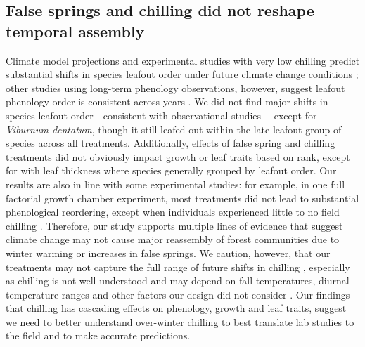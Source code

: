 \documentclass{article}\usepackage[]{graphicx}\usepackage[]{color}
\begin{document}
\subsection*{False springs and chilling did not reshape temporal assembly}
Climate model projections and experimental studies with very low chilling predict substantial shifts in species leafout order under future climate change conditions \citep{Roberts2015, Laube2014}; other studies using long-term phenology observations, however, suggest leafout phenology order is consistent across years \citep{Wesolowski2006}. We did not find major shifts in species leafout order---consistent with observational studies \citep{Wesolowski2006}---except for \textit{Viburnum dentatum}, though it still leafed out within the late-leafout group of species across all treatments. Additionally, effects of false spring and chilling treatments did not obviously impact growth or leaf traits based on rank, except for with leaf thickness where species generally grouped by leafout order. Our results are also in line with some experimental studies: for example, in one full factorial growth chamber experiment, most treatments did not lead to substantial phenological reordering, except when individuals experienced little to no field chilling \citep{Laube2014}. Therefore, our study supports multiple lines of evidence that suggest climate change may not cause major reassembly of forest communities due to winter warming or increases in false springs. We caution, however, that our treatments may not capture the full range of future shifts in chilling \citep[current forecasts for chilling vary highly across regions, see][]{Fraga2019}, especially as chilling is not well understood \citep{Nanninga2017} and may depend on fall temperatures, diurnal temperature ranges and other factors our design did not consider \citep{Dennis2003}. Our findings that chilling has cascading effects on phenology, growth and leaf traits, suggest we need to better understand over-winter chilling to best translate lab studies to the field and to make accurate predictions. 
    
\end{document}
